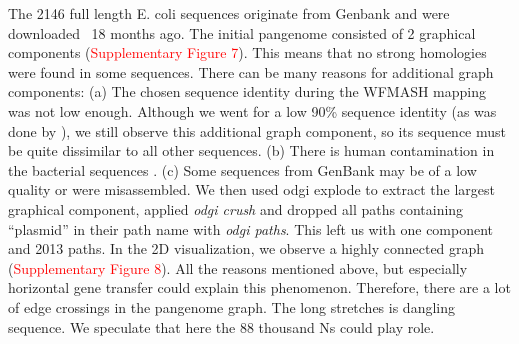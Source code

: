 \documentclass{bioinfo}
\theoremstyle{definition}
\newcommand{\red}[1]{{\textcolor{Red}{#1}}}
\begin{document}
	The 2146 full length E. coli sequences originate from Genbank \citep{Sayers2021} and were downloaded ~18 months ago. The initial pangenome consisted of 2 graphical components (\red{Supplementary Figure 7}). This means that no strong homologies were found in some sequences. There can be many reasons for additional graph components: (a) The chosen sequence identity during the WFMASH mapping was not low enough. Although we went for a low 90\% sequence identity (as was done by \cite{Garrison2023}), we still observe this additional graph component, so its sequence must be quite dissimilar to all other sequences. (b) There is human contamination in the bacterial sequences \citep{Breitwieser2019}. (c) Some sequences from GenBank may be of a low quality or were misassembled. We then used odgi explode to extract the largest graphical component, applied \textit{odgi crush} and dropped all paths containing “plasmid” in their path name with \textit{odgi paths}. This left us with one component and 2013 paths.
	In the 2D visualization, we observe a highly connected graph (\red{Supplementary Figure 8}). All the reasons mentioned above, but especially horizontal gene transfer could explain this phenomenon. Therefore, there are a lot of edge crossings in the pangenome graph. The long stretches is dangling sequence. We speculate that here the 88 thousand Ns could play role.
	
	
	
	
\end{document}
